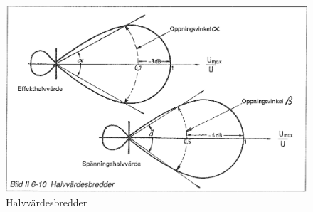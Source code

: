 \begin{figure}
  \includegraphics[width=\textwidth]{images/bild_2_6-10}
  \caption{Halvvärdesbredder}
  \label{fig:bildII6-10}
\end{figure}

